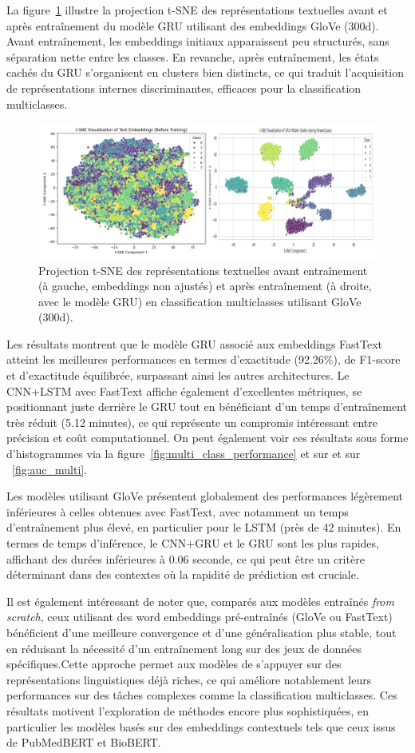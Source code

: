 \documentclass[12pt]{report}
\begin{document}
La figure~\ref{fig:gru_multi_tsne} illustre la projection t-SNE des représentations textuelles avant et après entraînement du modèle GRU utilisant des embeddings GloVe (300d). Avant entraînement, les embeddings initiaux apparaissent peu structurés, sans séparation nette entre les classes. En revanche, après entraînement, les états cachés du GRU s’organisent en clusters bien distincts, ce qui traduit l’acquisition de représentations internes discriminantes, efficaces pour la classification multiclasses.

\begin{figure}[H]
\centering
\includegraphics[width=0.7\linewidth]{gru_multi_tsne.png}
\caption{Projection t-SNE des représentations textuelles avant entraînement (à gauche, embeddings non ajustés) et après entraînement (à droite, avec le modèle GRU) en classification multiclasses utilisant GloVe (300d).}
\label{fig:gru_multi_tsne}
\end{figure}

Les résultats montrent que le modèle GRU associé aux embeddings FastText atteint les meilleures performances en termes d’exactitude (92.26\%), de F1-score et d’exactitude équilibrée, surpassant ainsi les autres architectures. Le CNN+LSTM avec FastText affiche également d’excellentes métriques, se positionnant juste derrière le GRU tout en bénéficiant d’un temps d’entraînement très réduit (5.12 minutes), ce qui représente un compromis intéressant entre précision et coût computationnel. On peut également voir ces résultats sous forme d'histogrammes via la figure~\ref{fig:multi_class_performance} et sur et sur ~\ref{fig:auc_multi}.

Les modèles utilisant GloVe présentent globalement des performances légèrement inférieures à celles obtenues avec FastText, avec notamment un temps d’entraînement plus élevé, en particulier pour le LSTM (près de 42 minutes). En termes de temps d’inférence, le CNN+GRU et le GRU sont les plus rapides, affichant des durées inférieures à 0.06 seconde, ce qui peut être un critère déterminant dans des contextes où la rapidité de prédiction est cruciale.

Il est également intéressant de noter que, comparés aux modèles entraînés \textit{from scratch}, ceux utilisant des word embeddings pré-entraînés (GloVe ou FastText) bénéficient d’une meilleure convergence et d’une généralisation plus stable, tout en réduisant la nécessité d’un entraînement long sur des jeux de données spécifiques.Cette approche permet aux modèles de s’appuyer sur des représentations linguistiques déjà riches, ce qui améliore notablement leurs performances sur des tâches complexes comme la classification multiclasses. Ces résultats motivent l’exploration de méthodes encore plus sophistiquées, en particulier les modèles basés sur des embeddings contextuels tels que ceux issus de PubMedBERT et BioBERT.
\end{document}
